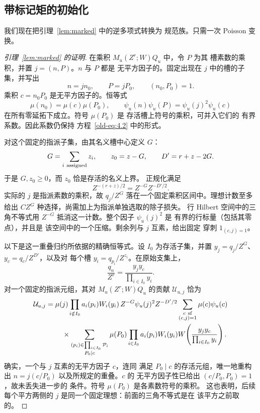 \subsection{带标记矩的初始化}

我们现在把引理~\ref{lem:marked} 中的逆多项式转换为
规范族。只需一次 Poisson 变换。

\begin{proof}[引理~\ref{lem:marked} 的证明]
在乘积 \(M_u(Z^r;W)Q_u\) 中，令 \(P\) 为其
槽素数的乘积，并置 \(j=(n,P)\)。\(n\) 与 \(P\) 都是
无平方因子的。固定出现在 \(j\) 中的槽的子集，并写出
\[
 n=jn_0,\qquad P=jP_0,\qquad (n_0,P_0)=1.
\]
乘积 \(c=n_0P_0\) 是无平方因子的。恒等式
\[
 \mu(n_0)=\mu(c)\mu(P_0),\qquad
 \psi_u(n)\psi_u(P)=\psi_u(j)^2\psi_u(c)
\]
在所有零延拓下成立。符号 \(\mu(P_0)\) 是
存活槽上符号的乘积，可并入它们的
有界系数。因此系数仍保持
方程~\eqref{old-eq:4.2} 中的形式。

对这个固定的指派子集，由其名义槽中心定义 \(G\)：
\[
 G=\sum_{i\ {\rm assigned}}z_i,\qquad
 z_0=z-G,\qquad D'=r+z-2G.
\]
于是 \(G,z_0\ge0\)，而 \(z_0\) 恰是存活的名义上界。
正规化满足
\[
 Z^{-(r+z)/2}=Z^{-G}Z^{-D'/2}.
\]
实际的 \(j\) 是指派素数的乘积，故
\(q_j/Z^G\) 落在一个固定乘积区间中。理想计数至多给出
\(CZ^G\) 种选择，尚需加上为指派单独选取的除子损失。
行 Hilbert 空间中的三角不等式用
\(Z^{-G}\) 抵消这一计数。整个因子 \(\psi_u(j)^2\) 是
有界的行标量（包括其零点），并且是
该空间中的一个压缩。剩余列与 \(j\) 互素，给出固定
穿刺 \(1_{(c,j)=1}\)。

以下是这一重叠归约所依据的精确恒等式。设
\(I_0\) 为存活子集，并置
\(y_j=q_j/Z^G\)、\(y_c=q_c/Z^{D'}\)，以及对
每个槽 \(y_i=q_{p_i}/Z^{z_i}\)。在原始支集上，
\[
 \frac{q_n}{Z^r}=\frac{y_jy_c}{\prod_{i\in I_0}y_i}.
\]
对一个固定的指派元组，其对
\(M_u(Z^r;W)Q_u\) 的贡献 \(\mathcal U_{u,j}\) 恰为
\begin{equation}\label{eq:initial-overlap-polynomial}
 \begin{split}
 \mathcal U_{u,j}={}&\mu(j)
 \prod_{i\notin I_0}a_i(p_i)W_i(y_i)\,
 Z^{-G}\psi_u(j)^2 Z^{-D'/2}
 \sum_{\substack{c\ {\rm sf}\\(c,j)=1}}\mu(c)\psi_u(c)\\
 &\quad\times
 \sum_{\substack{(p_i)\in\prod_{i\in I_0}\mathcal P_i\\P_0\mid c}}
 \mu(P_0)\prod_{i\in I_0}a_i(p_i)W_i(y_i)
 W\!\left(\frac{y_jy_c}{\prod_{i\in I_0}y_i}\right).
 \end{split}
\end{equation}
确实，一个与 \(j\) 互素的无平方因子 \(c\)，连同
满足 \(P_0\mid c\) 的存活元组，唯一地重构出
\(n=j(c/P_0)\) 以及所规定的重叠。\(c\) 的
无平方因子性已给出 \((c/P_0,P_0)=1\)，故未丢失进一步的
条件。符号 \(\mu(P_0)\) 是各素数符号的乘积。
这也表明，后续每个平方两侧的 \(j\)
是同一个固定理想：前面的三角不等式是在
该平方之前取的。


\end{proof}
